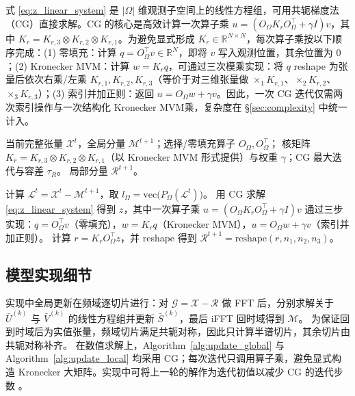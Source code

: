 \documentclass[UTF8]{ctexart}
\begin{document}
式 \eqref{eq:z_linear_system} 是 $|\Omega|$ 维观测子空间上的线性方程组，可用共轭梯度法（CG）直接求解。CG 的核心是高效计算一次算子乘 $u=(O_{\Omega}K_r O_{\Omega}^{\top}+\gamma I)v$，其中 $K_r=K_{r,3}\otimes K_{r,2}\otimes K_{r,1}$。为避免显式形成 $K_r\in\mathbb{R}^{N\times N}$，每次算子乘按以下顺序完成：(1) 零填充：计算 $q=O_{\Omega}^{\top}v\in\mathbb{R}^{N}$，即将 $v$ 写入观测位置，其余位置为 $0$；(2) Kronecker MVM：计算 $w=K_r q$，可通过三次模乘实现：将 $q$ reshape 为张量后依次右乘/左乘 $K_{r,1},K_{r,2},K_{r,3}$（等价于对三维张量做 $\times_1 K_{r,1}$、$\times_2 K_{r,2}$、$\times_3 K_{r,3}$）；(3) 索引并加正则：返回 $u=O_{\Omega}w+\gamma v$。因此，一次 CG 迭代仅需两次索引操作与一次结构化 Kronecker MVM乘，复杂度在 \S\ref{sec:complexity} 中统一计入。

\begin{algorithm}[!htbp]
\caption{更新局部分量}
\label{alg:update_local}
\begin{algorithmic}[1]
\Require 当前完整张量 $\mathcal{X}^{t}$，全局分量 $\mathcal{M}^{t+1}$；选择/零填充算子 $O_{\Omega},O_{\Omega}^{\top}$；
核矩阵 $K_r=K_{r,3}\otimes K_{r,2}\otimes K_{r,1}$（以 Kronecker MVM 形式提供）与权重 $\gamma$；CG 最大迭代与容差 $\tau_R$。
\Ensure 局部分量 $\mathcal{R}^{t+1}$。

\State 计算 $\mathcal{L}^{t}=\mathcal{X}^{t}-\mathcal{M}^{t+1}$，取 $l_{\Omega}=\mathrm{vec}\!\big(P_{\Omega}(\mathcal{L}^{t})\big)$。
\State 用 CG 求解 \eqref{eq:z_linear_system} 得到 $z$，其中一次算子乘 $u=(O_{\Omega}K_r O_{\Omega}^{\top}+\gamma I)v$ 通过三步实现：$q=O_{\Omega}^{\top}v$（零填充），$w=K_r q$（Kronecker MVM），$u=O_{\Omega}w+\gamma v$（索引并加正则）。
\State 计算 $r=K_r O_{\Omega}^{\top}z$，并 reshape 得到 $\mathcal{R}^{t+1}=\mathrm{reshape}(r,n_1,n_2,n_3)$。
\end{algorithmic}
\end{algorithm}
\subsection{模型实现细节}
\label{sec:impl}

实现中全局更新在频域逐切片进行：对 $\mathcal{G}=\mathcal{X}-\mathcal{R}$ 做 FFT 后，分别求解关于 $\bar U^{(k)}$ 与 $\bar V^{(k)}$ 的线性方程组并更新 $\bar S^{(k)}$，最后 iFFT 回时域得到 $\mathcal{M}$。
为保证回到时域后为实值张量，频域切片满足共轭对称，因此只计算半谱切片，其余切片由共轭对称补齐。
在数值求解上，Algorithm~\ref{alg:update_global} 与 Algorithm~\ref{alg:update_local} 均采用 CG；每次迭代只调用算子乘，避免显式构造 Kronecker 大矩阵。实现中可将上一轮的解作为迭代初值以减少 CG 的迭代步数 。
\end{document}

